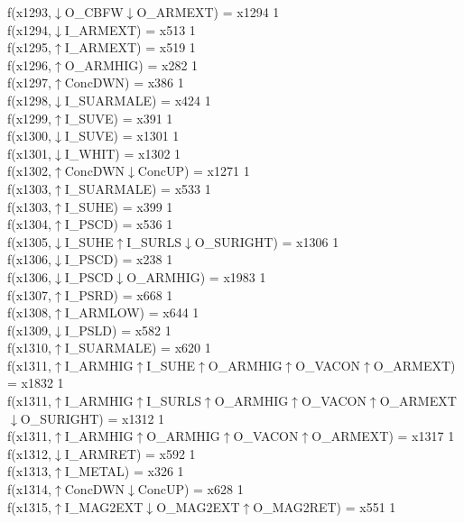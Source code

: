 f(x1293,$\downarrow$O\_CBFW$\downarrow$O\_ARMEXT) = x1294 {1} \\
f(x1294,$\downarrow$I\_ARMEXT) = x513 {1} \\
f(x1295,$\uparrow$I\_ARMEXT) = x519 {1} \\
f(x1296,$\uparrow$O\_ARMHIG) = x282 {1} \\
f(x1297,$\uparrow$ConcDWN) = x386 {1} \\
f(x1298,$\downarrow$I\_SUARMALE) = x424 {1} \\
f(x1299,$\uparrow$I\_SUVE) = x391 {1} \\
f(x1300,$\downarrow$I\_SUVE) = x1301 {1} \\
f(x1301,$\downarrow$I\_WHIT) = x1302 {1} \\
f(x1302,$\uparrow$ConcDWN$\downarrow$ConcUP) = x1271 {1} \\
f(x1303,$\uparrow$I\_SUARMALE) = x533 {1} \\
f(x1303,$\uparrow$I\_SUHE) = x399 {1} \\
f(x1304,$\uparrow$I\_PSCD) = x536 {1} \\
f(x1305,$\downarrow$I\_SUHE$\uparrow$I\_SURLS$\downarrow$O\_SURIGHT) = x1306 {1} \\
f(x1306,$\downarrow$I\_PSCD) = x238 {1} \\
f(x1306,$\downarrow$I\_PSCD$\downarrow$O\_ARMHIG) = x1983 {1} \\
f(x1307,$\uparrow$I\_PSRD) = x668 {1} \\
f(x1308,$\uparrow$I\_ARMLOW) = x644 {1} \\
f(x1309,$\downarrow$I\_PSLD) = x582 {1} \\
f(x1310,$\uparrow$I\_SUARMALE) = x620 {1} \\
f(x1311,$\uparrow$I\_ARMHIG$\uparrow$I\_SUHE$\uparrow$O\_ARMHIG$\uparrow$O\_VACON$\uparrow$O\_ARMEXT) = x1832 {1} \\
f(x1311,$\uparrow$I\_ARMHIG$\uparrow$I\_SURLS$\uparrow$O\_ARMHIG$\uparrow$O\_VACON$\uparrow$O\_ARMEXT$\downarrow$O\_SURIGHT) = x1312 {1} \\
f(x1311,$\uparrow$I\_ARMHIG$\uparrow$O\_ARMHIG$\uparrow$O\_VACON$\uparrow$O\_ARMEXT) = x1317 {1} \\
f(x1312,$\downarrow$I\_ARMRET) = x592 {1} \\
f(x1313,$\uparrow$I\_METAL) = x326 {1} \\
f(x1314,$\uparrow$ConcDWN$\downarrow$ConcUP) = x628 {1} \\
f(x1315,$\uparrow$I\_MAG2EXT$\downarrow$O\_MAG2EXT$\uparrow$O\_MAG2RET) = x551 {1} \\
